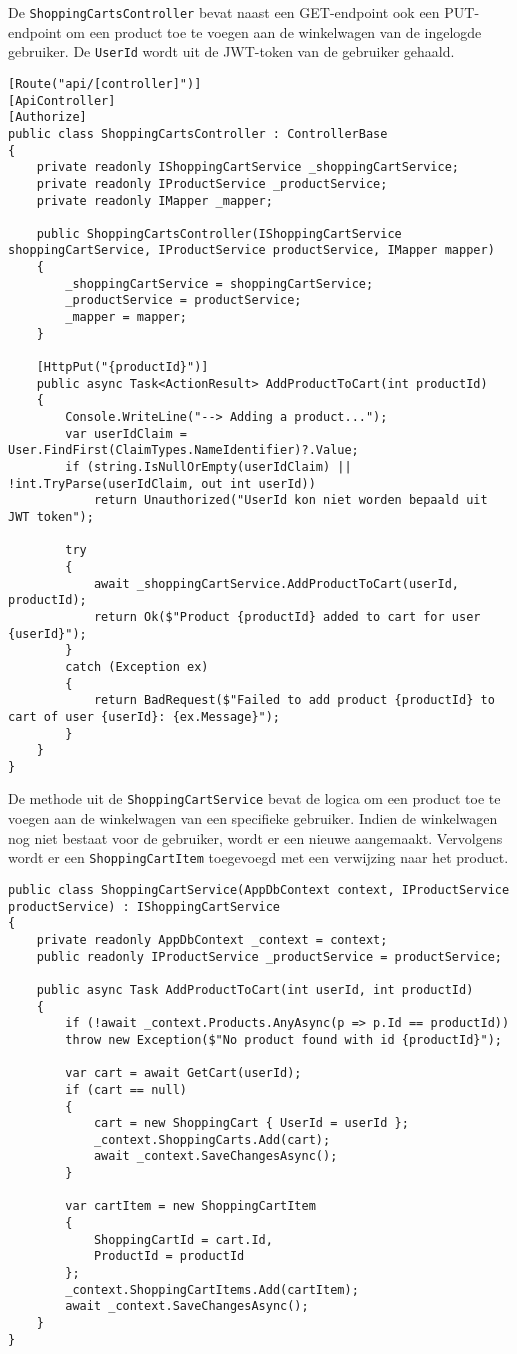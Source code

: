 \medskip
De \texttt{ShoppingCartsController} bevat naast een GET-endpoint ook een PUT-endpoint om een product toe te voegen aan de winkelwagen van de ingelogde gebruiker. De \texttt{UserId} wordt uit de JWT-token van de gebruiker gehaald.
\medskip

\begin{lstlisting}[style=mystyleA, caption=ShoppingCartsController.cs (fragment), label=lst:MonoShoppingCartController]
[Route("api/[controller]")]
[ApiController]
[Authorize]
public class ShoppingCartsController : ControllerBase
{
	private readonly IShoppingCartService _shoppingCartService;
	private readonly IProductService _productService;
	private readonly IMapper _mapper;
	
	public ShoppingCartsController(IShoppingCartService shoppingCartService, IProductService productService, IMapper mapper)
	{
		_shoppingCartService = shoppingCartService;
		_productService = productService;
		_mapper = mapper;
	}
	
	[HttpPut("{productId}")]
	public async Task<ActionResult> AddProductToCart(int productId)
	{
		Console.WriteLine("--> Adding a product...");
		var userIdClaim = User.FindFirst(ClaimTypes.NameIdentifier)?.Value;
		if (string.IsNullOrEmpty(userIdClaim) || !int.TryParse(userIdClaim, out int userId))
			return Unauthorized("UserId kon niet worden bepaald uit JWT token");
		
		try
		{
			await _shoppingCartService.AddProductToCart(userId, productId);
			return Ok($"Product {productId} added to cart for user {userId}");
		}
		catch (Exception ex)
		{
			return BadRequest($"Failed to add product {productId} to cart of user {userId}: {ex.Message}");
		}
	}
}
\end{lstlisting}

\medskip
De methode uit de \texttt{ShoppingCartService} bevat de logica om een product toe te voegen aan de winkelwagen van een specifieke gebruiker. Indien de winkelwagen nog niet bestaat voor de gebruiker, wordt er een nieuwe aangemaakt. Vervolgens wordt er een \texttt{ShoppingCartItem} toegevoegd met een verwijzing naar het product.
\medskip

\begin{lstlisting}[style=mystyleA, caption=ShoppingCartService.cs (fragment), label=lst:MonoShoppingCartService]
public class ShoppingCartService(AppDbContext context, IProductService productService) : IShoppingCartService
{
	private readonly AppDbContext _context = context;
	public readonly IProductService _productService = productService;
	
	public async Task AddProductToCart(int userId, int productId)
	{
		if (!await _context.Products.AnyAsync(p => p.Id == productId))
		throw new Exception($"No product found with id {productId}");
		
		var cart = await GetCart(userId);
		if (cart == null)
		{
			cart = new ShoppingCart { UserId = userId };
			_context.ShoppingCarts.Add(cart);
			await _context.SaveChangesAsync();
		}
		
		var cartItem = new ShoppingCartItem
		{
			ShoppingCartId = cart.Id,
			ProductId = productId
		};
		_context.ShoppingCartItems.Add(cartItem);
		await _context.SaveChangesAsync();
	}
}
\end{lstlisting}


